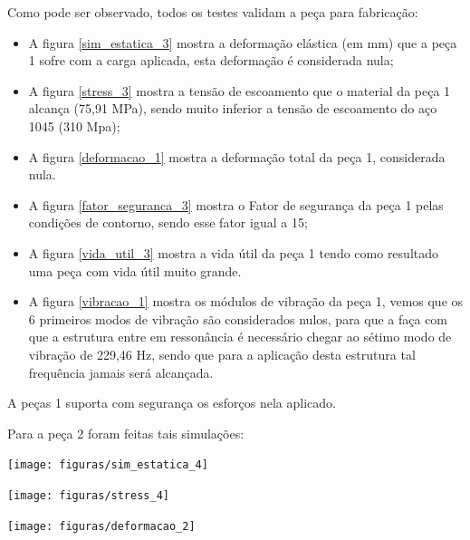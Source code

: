     Como pode ser observado, todos os testes validam a peça para fabricação:
    \begin{itemize}
        \item A figura \ref{sim_estatica_3} mostra a deformação elástica (em mm) que a peça 1 sofre com a carga aplicada, esta deformação é considerada nula;
        \item A figura \ref{stress_3} mostra a tensão de escoamento que o material da peça 1 alcança (75,91 MPa), sendo muito inferior a tensão de escoamento do aço 1045 (310 Mpa);
        \item A figura \ref{deformacao_1} mostra a deformação total da peça 1, considerada nula.
        \item A figura \ref{fator_seguranca_3} mostra o Fator de segurança da peça 1 pelas condições de contorno, sendo esse fator igual a 15;
        \item A figura \ref{vida_util_3} mostra a vida útil da peça 1 tendo como resultado uma peça com vida útil muito grande.
        \item A figura \ref{vibracao_1} mostra os módulos de vibração da peça 1, vemos que os 6 primeiros modos de vibração são considerados nulos, para que a faça com que a estrutura entre em ressonância é necessário chegar ao sétimo modo de vibração de 229,46 Hz, sendo que para a aplicação desta estrutura tal frequência jamais será alcançada.
    \end{itemize}

    A peças 1 suporta com segurança os esforços nela aplicado.

    Para a peça 2 foram feitas tais simulações:


    \begin{center}
    	\texttt{[image: figuras/sim\_estatica\_4]}
        \label{sim_estatica_4}
    \end{center}

    \begin{center}
    	\texttt{[image: figuras/stress\_4]}
        \label{stress_4}
    \end{center}

    \begin{center}
    	\texttt{[image: figuras/deformacao\_2]}
        \label{deformacao_2}
    \end{center}

